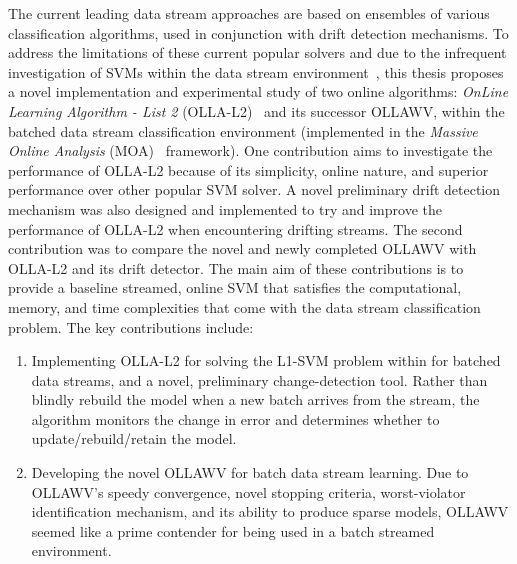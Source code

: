 \documentclass[reqno]{vcuthesis}
\newcommand{\iitem}{\item[-]}
\numberwithin{equation}{chapter}
\begin{document}
The current leading data stream approaches are based on ensembles of various classification algorithms, used in conjunction with drift detection mechanisms. To address the limitations of these current popular solvers and due to the infrequent investigation of SVMs within the data stream environment~\cite{aggarwal}, this thesis proposes a novel implementation and experimental study of two online algorithms: \textit{OnLine Learning Algorithm - List 2} (OLLA-L2)~\cite{kecman2016fast} and its successor OLLAWV, within the batched data stream classification environment (implemented in the \textit{Massive Online Analysis} (MOA)~\cite{moacite} framework). One contribution aims to investigate the performance of OLLA-L2 because of its simplicity, online nature, and superior performance over other popular SVM solver. A novel preliminary drift detection mechanism was also designed and implemented to try and improve the performance of OLLA-L2 when encountering drifting streams. The second contribution was to compare the novel and newly completed OLLAWV with OLLA-L2 and its drift detector. The main aim of these contributions is to provide a baseline streamed, online SVM that satisfies the computational, memory, and time complexities that come with the data stream classification problem. The key contributions include:
\begin{enumerate}
\iitem Implementing OLLA-L2 for solving the L1-SVM problem within for batched data streams, and a novel, preliminary change-detection tool. Rather than blindly rebuild the model when a new batch arrives from the stream, the algorithm monitors the change in error and determines whether to update/rebuild/retain the model.

\iitem Developing the novel OLLAWV for batch data stream learning. Due to OLLAWV's speedy convergence, novel stopping criteria, worst-violator identification mechanism, and its ability to produce sparse models, OLLAWV seemed like a prime contender for being used in a batch streamed environment.

\end{enumerate}
\end{document}
